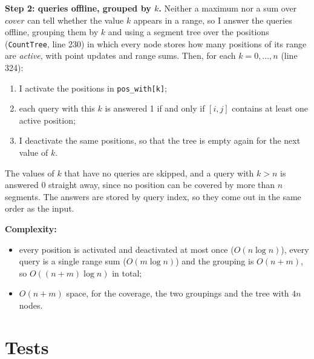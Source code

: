 \documentclass[11pt,a4paper]{article}
\begin{document}
\textbf{Step 2: queries offline, grouped by $k$.} Neither a maximum nor a sum over $\mathit{cover}$ can tell
whether the value $k$ appears in a range, so I answer the queries offline, grouping them by $k$ and using a
segment tree over the positions (\texttt{CountTree}, line 230) in which every node stores how many positions of
its range are \emph{active}, with point updates and range sums. Then, for each $k = 0, \dots, n$ (line 324):
\begin{enumerate}
\item I activate the positions in \texttt{pos\_with[k]};
\item each query with this $k$ is answered 1 if and only if $[i,j]$ contains at least one active position;
\item I deactivate the same positions, so that the tree is empty again for the next value of $k$.
\end{enumerate}
The values of $k$ that have no queries are skipped, and a query with $k > n$ is answered 0 straight away,
since no position can be covered by more than $n$ segments. The answers are stored by query index, so they
come out in the same order as the input.

\textbf{Complexity:}
\begin{itemize}
\item every position is activated and deactivated at most once ($O(n\log n)$), every query is a single range
sum ($O(m \log n)$) and the grouping is $O(n+m)$, so $O((n+m)\log n)$ in total;
\item $O(n+m)$ space, for the coverage, the two groupings and the tree with $4n$ nodes.
\end{itemize}

\section*{Tests}
\end{document}
